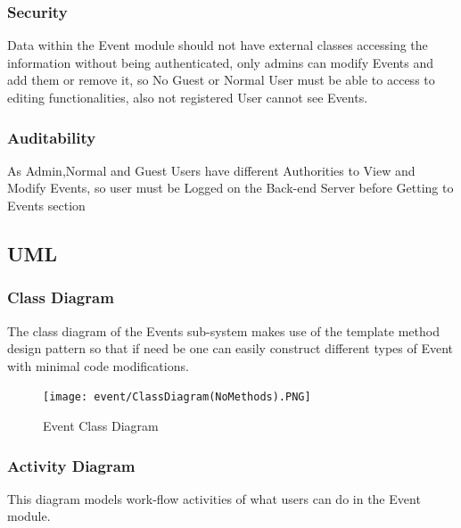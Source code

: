 \subsubsection{Security}
Data within the Event module should not have external classes accessing the information without being authenticated, only admins can modify Events and add them or remove it, so No Guest or Normal User must be able to access to editing functionalities, also not registered User cannot see Events.

\subsubsection{Auditability}
As Admin,Normal and Guest Users have different Authorities to View and Modify Events, so user must be Logged on the Back-end Server before Getting to Events section

\pagebreak
\subsection{UML}
\subsubsection{Class Diagram}
The class diagram of the Events sub-system makes use of the template method design pattern so that if need be one can easily construct different types of Event with minimal code modifications.

\begin{figure}[H]
	\centering
	\texttt{[image: event/ClassDiagram(NoMethods).PNG]}
	\caption{Event Class Diagram}
\end{figure}



\pagebreak
\subsubsection{Activity Diagram}
This diagram models work-flow activities of what users can do in the Event module.

